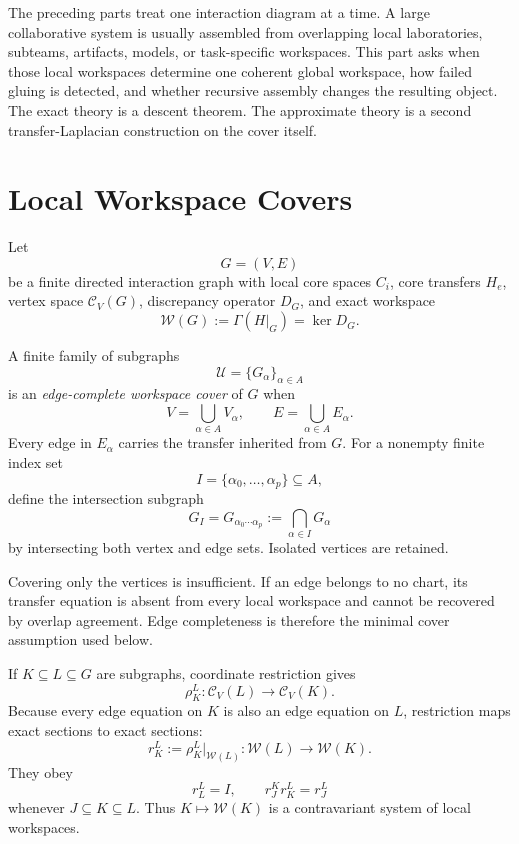 The preceding parts treat one interaction diagram at a time. A large
collaborative system is usually assembled from overlapping local laboratories,
subteams, artifacts, models, or task-specific workspaces. This part asks when
those local workspaces determine one coherent global workspace, how failed
gluing is detected, and whether recursive assembly changes the resulting
object. The exact theory is a descent theorem. The approximate theory is a
second transfer-Laplacian construction on the cover itself.

\section{Local Workspace Covers}


Let
\[
G=(V,E)
\]
be a finite directed interaction graph with local core spaces \(C_i\), core
transfers \(H_e\), vertex space \(\mathcal C_V(G)\), discrepancy operator
\(D_G\), and exact workspace
\[
\mathscr W(G)
:=
\Gamma(H|_G)
=
\ker D_G.
\]

\begin{SRWTdefinition}\label{SRWT:def:workspace-cover}
A finite family of subgraphs
\[
\mathcal U=\{G_\alpha\}_{\alpha\in A}
\]
is an \emph{edge-complete workspace cover} of \(G\) when
\[
V=\bigcup_{\alpha\in A}V_\alpha,
\qquad
E=\bigcup_{\alpha\in A}E_\alpha.
\]
Every edge in \(E_\alpha\) carries the transfer inherited from \(G\). For a
nonempty finite index set
\[
I=\{\alpha_0,\ldots,\alpha_p\}\subseteq A,
\]
define the intersection subgraph
\[
G_I
=
G_{\alpha_0\cdots\alpha_p}
:=
\bigcap_{\alpha\in I}G_\alpha
\]
by intersecting both vertex and edge sets. Isolated vertices are retained.
\end{SRWTdefinition}

Covering only the vertices is insufficient. If an edge belongs to no chart,
its transfer equation is absent from every local workspace and cannot be
recovered by overlap agreement. Edge completeness is therefore the minimal
cover assumption used below.

If \(K\subseteq L\subseteq G\) are subgraphs, coordinate restriction gives
\[
\rho_K^L:\mathcal C_V(L)\longrightarrow\mathcal C_V(K).
\]
Because every edge equation on \(K\) is also an edge equation on \(L\),
restriction maps exact sections to exact sections:
\[
r_K^L
:=
\rho_K^L|_{\mathscr W(L)}:
\mathscr W(L)\longrightarrow\mathscr W(K).
\]
They obey
\[
r_L^L=I,
\qquad
r_J^K r_K^L=r_J^L
\]
whenever \(J\subseteq K\subseteq L\). Thus \(K\mapsto\mathscr W(K)\) is a
contravariant system of local workspaces.

